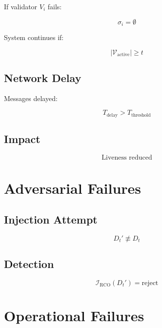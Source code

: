 If validator $V_i$ fails:

\begin{equation}
\sigma_i = \emptyset
\end{equation}

System continues if:

\begin{equation}
|\mathcal{V}_{\text{active}}| \geq t
\end{equation}

\subsection{Network Delay}

Messages delayed:

\begin{equation}
T_{\text{delay}} > T_{\text{threshold}}
\end{equation}

\subsection{Impact}

\begin{equation}
\text{Liveness reduced}
\end{equation}

\section{Adversarial Failures}

\subsection{Injection Attempt}

\begin{equation}
D_t' \not\equiv D_t
\end{equation}

\subsection{Detection}

\begin{equation}
\mathcal{I}_{\text{RCO}}(D_t') = \text{reject}
\end{equation}

\section{Operational Failures}

